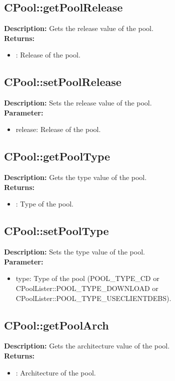\subsection{CPool::getPoolRelease}
\textbf{Description:} Gets the release value of the pool.\\
\textbf{Returns:}
\begin{itemize}
\item : Release of the pool.
\end{itemize}

\subsection{CPool::setPoolRelease}
\textbf{Description:} Sets the release value of the pool.\\
\textbf{Parameter:}
\begin{itemize}
\item release: Release of the pool.
\end{itemize}

\subsection{CPool::getPoolType}
\textbf{Description:} Gets the type value of the pool.\\
\textbf{Returns:}
\begin{itemize}
\item : Type of the pool.
\end{itemize}

\subsection{CPool::setPoolType}
\textbf{Description:} Sets the type value of the pool.\\
\textbf{Parameter:}
\begin{itemize}
\item type: Type of the pool (POOL\_TYPE\_CD or CPoolLister::POOL\_TYPE\_DOWNLOAD or CPoolLister::POOL\_TYPE\_USECLIENTDEBS).
\end{itemize}

\subsection{CPool::getPoolArch}
\textbf{Description:} Gets the architecture value of the pool.\\
\textbf{Returns:}
\begin{itemize}
\item : Architecture of the pool.
\end{itemize}

